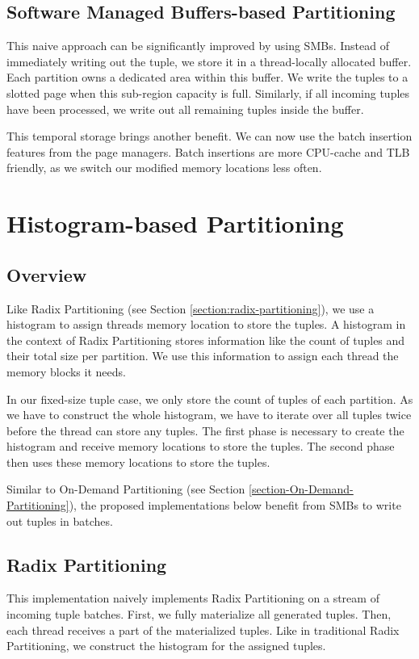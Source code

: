 \subsection{Software Managed Buffers-based Partitioning}

This naive approach can be significantly improved by using \acfp{SMB}.
Instead of immediately writing out the tuple, we store it in a thread-locally allocated buffer.
Each partition owns a dedicated area within this buffer.
We write the tuples to a slotted page when this sub-region capacity is full.
Similarly, if all incoming tuples have been processed, we write out all remaining tuples inside the buffer.

This temporal storage brings another benefit.
We can now use the batch insertion features from the page managers.
Batch insertions are more \ac{CPU}-cache and \ac{TLB} friendly, as we switch our modified memory locations less often.

\section{Histogram-based Partitioning}
\subsection{Overview}
Like Radix Partitioning (see Section \ref{section:radix-partitioning}), we use a histogram to assign threads memory location to store the tuples.
A histogram in the context of Radix Partitioning stores information like the count of tuples and their total size per partition.
We use this information to assign each thread the memory blocks it needs.

In our fixed-size tuple case, we only store the count of tuples of each partition.
As we have to construct the whole histogram, we have to iterate over all tuples twice before the thread can store any tuples.
The first phase is necessary to create the histogram and receive memory locations to store the tuples.
The second phase then uses these memory locations to store the tuples.

Similar to On-Demand Partitioning (see Section \ref{section-On-Demand-Partitioning}), the proposed implementations below benefit from \acfp{SMB} to write out tuples in batches.
\subsection{Radix Partitioning}
This implementation naively implements Radix Partitioning on a stream of incoming tuple batches.
First, we fully materialize all generated tuples.
Then, each thread receives a part of the materialized tuples.
Like in traditional Radix Partitioning, we construct the histogram for the assigned tuples.

